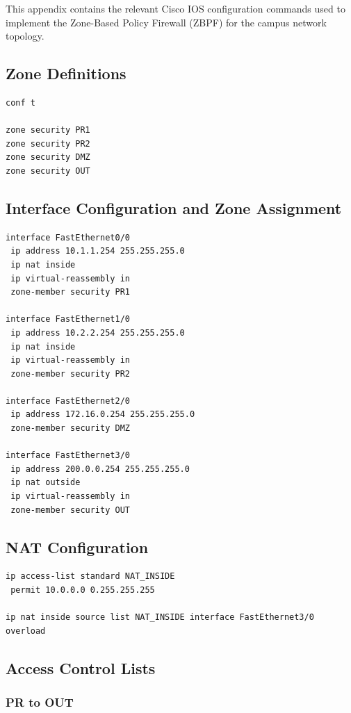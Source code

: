 \documentclass[12pt]{article}
\begin{document}
This appendix contains the relevant Cisco IOS configuration commands used to implement the Zone-Based Policy Firewall (ZBPF) for the campus network topology.

\subsection{Zone Definitions}

\begin{lstlisting}
conf t

zone security PR1
zone security PR2
zone security DMZ
zone security OUT
\end{lstlisting}

\subsection{Interface Configuration and Zone Assignment}

\begin{lstlisting}
interface FastEthernet0/0
 ip address 10.1.1.254 255.255.255.0
 ip nat inside
 ip virtual-reassembly in
 zone-member security PR1

interface FastEthernet1/0
 ip address 10.2.2.254 255.255.255.0
 ip nat inside
 ip virtual-reassembly in
 zone-member security PR2

interface FastEthernet2/0
 ip address 172.16.0.254 255.255.255.0
 zone-member security DMZ

interface FastEthernet3/0
 ip address 200.0.0.254 255.255.255.0
 ip nat outside
 ip virtual-reassembly in
 zone-member security OUT
\end{lstlisting}

\subsection{NAT Configuration}

\begin{lstlisting}
ip access-list standard NAT_INSIDE
 permit 10.0.0.0 0.255.255.255

ip nat inside source list NAT_INSIDE interface FastEthernet3/0 overload
\end{lstlisting}

\subsection{Access Control Lists}

\subsubsection{PR to OUT}
\end{document}
